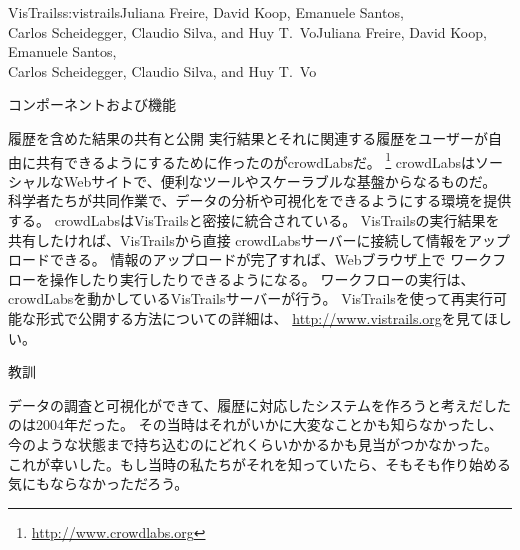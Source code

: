 \begin{aosachaptertoc}{VisTrails}{s:vistrails}{Juliana Freire, David Koop, Emanuele Santos, \\ Carlos Scheidegger, Claudio Silva, and Huy T.\ Vo}{Juliana Freire, David Koop, Emanuele Santos, \\ \hspace*{0.9cm} Carlos Scheidegger, Claudio Silva, and Huy T.\ Vo}
\begin{aosasect1}{コンポーネントおよび機能}
\begin{aosasect2}{履歴を含めた結果の共有と公開}
実行結果とそれに関連する履歴をユーザーが自由に共有できるようにするために作ったのがcrowdLabsだ。
\footnote{\url{http://www.crowdlabs.org}}
crowdLabsはソーシャルなWebサイトで、便利なツールやスケーラブルな基盤からなるものだ。
科学者たちが共同作業で、データの分析や可視化をできるようにする環境を提供する。
crowdLabsはVisTrailsと密接に統合されている。
VisTrailsの実行結果を共有したければ、VisTrailsから直接
crowdLabsサーバーに接続して情報をアップロードできる。
情報のアップロードが完了すれば、Webブラウザ上で
ワークフローを操作したり実行したりできるようになる。
ワークフローの実行は、crowdLabsを動かしているVisTrailsサーバーが行う。
VisTrailsを使って再実行可能な形式で公開する方法についての詳細は、
\url{http://www.vistrails.org}を見てほしい。

\end{aosasect2}

\end{aosasect1}

\begin{aosasect1}{教訓}

データの調査と可視化ができて、履歴に対応したシステムを作ろうと考えだしたのは2004年だった。
その当時はそれがいかに大変なことかも知らなかったし、今のような状態まで持ち込むのにどれくらいかかるかも見当がつかなかった。
これが幸いした。もし当時の私たちがそれを知っていたら、そもそも作り始める気にもならなかっただろう。


\end{aosasect1}
\end{aosachaptertoc}
